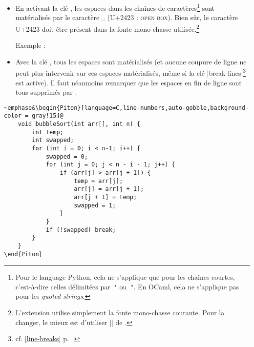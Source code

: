 \documentclass[dvipsnames,svgnames]{article}
\begin{document}
\begin{itemize}
Cette clé peut prendre comme valeur une longueur explicite mais aussi la valeur spéciale~|min|. Avec cette valeur,
la largeur sera calculée à partir de la largeur maximale des lignes de code. Attention : l'usage de cette valeur
spéciale~|min| requiert deux compilations LuaLaTeX\footnote{La largeur maximale est calculée lors de la première
compilation, écrite sur le fichier~|aux|, puis réutilisée lors de la compilation suivante. Certains outils comme
|latexmk| (utilisé par Overleaf) effectuent automatiquement un nombre suffisant de compilations.}.

Pour un exemple d'utilisation de |width=min|, voir la partie~\ref{example-comments} sur les exemples, p.~\pageref{example-comments}.

\item {} En activant la clé , les espaces dans les
chaînes de caractères\footnote{Pour le language Python, cela ne s'applique que pour les chaînes courtes, c'est-à-dire
celles délimitées par~\verb|'| ou~\verb|"|. En OCaml, cela ne s'applique pas pour les \emph{quoted strings}.} sont
matérialisés par le caractère ␣ (U+2423 : \textsc{open box}). Bien sûr, le caractère U+2423 doit être présent dans la fonte mono-chasse utilisée.\footnote{L'extension  utilise
  simplement la fonte mono-chasse courante. Pour la changer, le mieux est d'utiliser |\setmonofont| de
  .}\par\nobreak
%
\begingroup
{}
Exemple : 
\endgroup

\item {} Avec la clé , tous les espaces sont matérialisés (et aucune coupure de ligne ne peut
plus intervenir sur ces espaces matérialisés, même si la clé |break-lines|\footnote{cf. \ref{line-breaks}
  p.~\pageref{line-breaks}.} est active). Il faut néanmoins remarquer que les espaces en fin de ligne sont tous
supprimés par .
\end{itemize}

\bigskip

\begingroup
{}
\begin{Verbatim}
~emphase&\begin{Piton}[language=C,line-numbers,auto-gobble,background-color = gray!15]@
    void bubbleSort(int arr[], int n) {
        int temp;
        int swapped;
        for (int i = 0; i < n-1; i++) {
            swapped = 0;
            for (int j = 0; j < n - i - 1; j++) {
                if (arr[j] > arr[j + 1]) {
                    temp = arr[j];
                    arr[j] = arr[j + 1];
                    arr[j + 1] = temp;
                    swapped = 1; 
                }
            }
            if (!swapped) break;
        }
    }   
\end{Piton}
\end{Verbatim}
\endgroup
\end{document}
